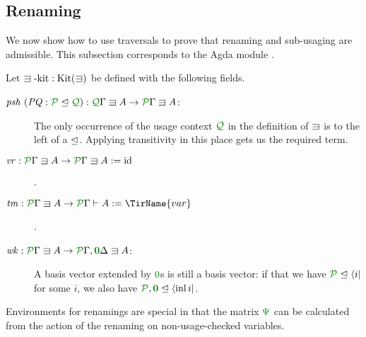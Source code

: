 \documentclass[submission,copyright,creativecommons]{eptcs}
\begin{document}
\subsection{Renaming}

We now show how to use traversals to prove that renaming and
sub-usaging are admissible. This subsection corresponds to the Agda
module .

\begin{definition}\label{def:lvar-kit}
  Let $\lvar\textrm{-kit} : \kit(\lvar)$ be defined with the following
  fields.
  \begin{description}
    \item[$\mathit{psh}~(\mathit{PQ} : \resctx P \subres \resctx Q)
      : \ctx{\Gamma}{Q} \lvar A \to \ctx{\Gamma}{P} \lvar A$:]
      The only occurrence of the usage context $\resctx Q$ in the definition of
      $\lvar$ is to the left of a $\trianglelefteq$.
      Applying transitivity in this place gets us the required term.
    \item[$\mathit{vr} : \ctx{\Gamma}{P} \lvar A \to \ctx{\Gamma}{P} \lvar A
      := \mathrm{id}$].
    \item[$\mathit{tm} : \ctx{\Gamma}{P} \lvar A \to \ctx{\Gamma}{P} \vdash A
      := \TirName{var}$].
    \item[$\mathit{wk} : \ctx{\Gamma}{P} \lvar A
      \to \ctx{\Gamma}{P}, \ctx{\Delta}{\vct 0} \lvar A$:]
      A basis vector extended by $\rescomment 0$s is still a basis
      vector: if that we have $\resctx P \subres \langle i \rvert$ for some $i$,
      we also have
      $\resctx P, \rescomment{\vct 0} \subres \langle \inl i \rvert$.
  \end{description}
\end{definition}

Environments for renamings are special in that the matrix $\rescomment\Psi$ can
be calculated from the action of the renaming on non-usage-checked variables.
\end{document}
